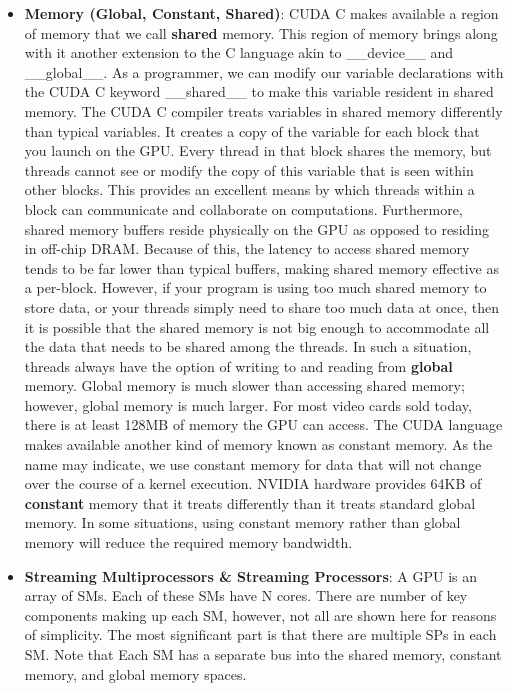 \documentclass[12pt]{article}
\numberwithin{equation}{section}
\numberwithin{table}{section}
\numberwithin{figure}{section}
\begin{document}
\begin{itemize}
	\item \textbf{Memory  (Global, Constant, Shared)}: CUDA C makes available a region of memory that we call \textbf{shared} memory. This region of memory brings along with it another extension to the C language akin to \_\_device\_\_ and \_\_global\_\_. As a programmer, we can modify our variable declarations with the CUDA C keyword \_\_shared\_\_ to make this variable resident in shared memory. The CUDA C compiler treats variables in shared memory differently than typical variables. It creates a copy of the variable for each block that you launch on the GPU. Every thread in that block shares the memory, but threads cannot see or modify the copy of this variable that is seen within other blocks. This provides an excellent means by which threads within a block can communicate and collaborate on computations. Furthermore, shared memory buffers reside physically on the GPU as opposed to residing in off-chip DRAM. Because of this, the latency to access shared memory tends to be far lower than typical buffers, making shared memory effective as a per-block. However, if your program is using too much shared memory to store data, or your threads simply need to share too much data at once, then it is possible that the shared memory is not big enough to accommodate all the data that needs to be shared among the threads. In such a situation, threads always have the option of writing to and reading from \textbf{global} memory. Global memory is much slower than accessing shared memory; however, global memory is much larger. For most video cards sold today, there is at least 128MB of memory the GPU can access. The CUDA language makes available another kind of memory known as constant memory. As the name may indicate, we use constant memory for data that will not change over the course of a kernel execution. NVIDIA hardware provides 64KB of \textbf{constant} memory that it treats differently than it treats standard global memory. In some situations, using constant memory rather than global memory will reduce the required memory bandwidth.
	
	\item \textbf{Streaming Multiprocessors \& Streaming Processors}: A GPU is an array of SMs. Each of these SMs have N cores. There are number of key components making
	up each SM, however, not all are shown here for reasons of simplicity. The most significant part is that
	there are multiple SPs in each SM. Note that Each SM has a separate bus into the shared memory, constant memory, and global memory
	spaces.
	

\end{itemize}
\end{document}
